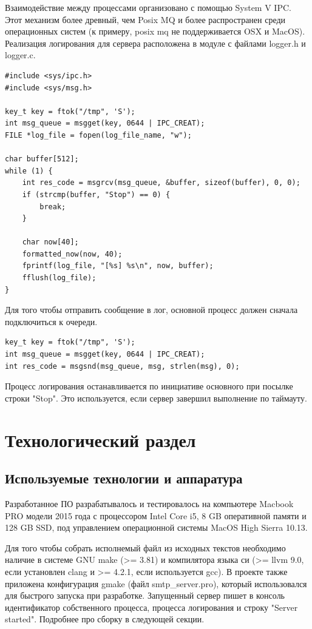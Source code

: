 \documentclass[a4paper,12pt]{report}
\begin{document}
Взаимодействие между процессами организовано с помощью System V IPC. Этот механизм более древный, чем Posix MQ и более распространен среди операционных систем (к примеру, posix mq не поддерживается OSX и MacOS). Реализация логирования для сервера расположена в модуле с файлами logger.h и logger.c.

\begin{verbatim}
#include <sys/ipc.h>
#include <sys/msg.h>

key_t key = ftok("/tmp", 'S');
int msg_queue = msgget(key, 0644 | IPC_CREAT);
FILE *log_file = fopen(log_file_name, "w");

char buffer[512];
while (1) {
    int res_code = msgrcv(msg_queue, &buffer, sizeof(buffer), 0, 0);
    if (strcmp(buffer, "Stop") == 0) {
        break;
    }

    char now[40];
    formatted_now(now, 40);
    fprintf(log_file, "[%s] %s\n", now, buffer);
    fflush(log_file);
}
\end{verbatim}

Для того чтобы отправить сообщение в лог, основной процесс должен сначала подключиться к очереди.
\begin{verbatim}
key_t key = ftok("/tmp", 'S');
int msg_queue = msgget(key, 0644 | IPC_CREAT);
int res_code = msgsnd(msg_queue, msg, strlen(msg), 0);
\end{verbatim}

Процесс логирования останавливается по инициативе основного при посылке строки "Stop". Это используется, если сервер завершил выполнение по таймауту.


\chapter{Технологический раздел}


\section{Используемые технологии и аппаратура}

Разработанное ПО разрабатывалось и тестировалось на компьютере Macbook PRO модели 2015 года с процессором Intel Core i5, 8 GB оперативной памяти и 128 GB SSD, под управлением операционной системы MacOS High Sierra 10.13.

Для того чтобы собрать исполнемый файл из исходных текстов необходимо наличие в системе GNU make (>= 3.81) и компилятора языка си (>= llvm 9.0, если установлен clang и >= 4.2.1, если используется gcc). В проекте также приложена конфигурация gmake (файл smtp_server.pro), который использовался для быстрого запуска при разработке. Запущенный сервер пишет в консоль идентификатор собственного процесса, процесса логирования и строку "Server started". Подробнее про сборку в следующей секции.
\end{document}
